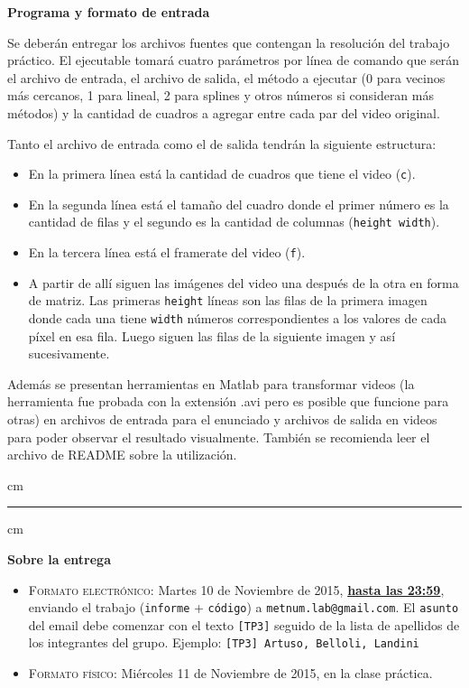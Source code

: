 {\bf\noindent Programa y formato de entrada}

Se deberán entregar los archivos fuentes que contengan la resolución del trabajo práctico. El ejecutable tomará cuatro parámetros por línea de comando que serán el archivo de entrada, el archivo de salida, el método a ejecutar (0 para vecinos más cercanos, 1 para lineal, 2 para splines y otros números si consideran más métodos) y la cantidad de cuadros a agregar entre cada par del video original.

Tanto el archivo de entrada como el de salida tendrán la siguiente estructura:

\begin{itemize}
  \item En la primera línea está la cantidad de cuadros que tiene el video (\verb|c|).
  \item En la segunda línea está el tamaño del cuadro donde el primer número es la cantidad de filas y el segundo es la cantidad de columnas (\verb|height width|).
  \item En la tercera línea está el framerate del video (\verb|f|).
  \item A partir de allí siguen las imágenes del video una después de la otra en forma de matriz. Las primeras \verb|height| l\'ineas son las filas de la primera imagen donde cada una tiene \verb|width| n\'umeros correspondientes a los valores de cada píxel en esa fila. Luego siguen las filas de la siguiente imagen y as\'i sucesivamente.
\end{itemize}

Además se presentan herramientas en Matlab para transformar videos (la herramienta fue probada con la extensión .avi pero es posible que funcione para otras) en archivos de entrada para el enunciado y archivos de salida en videos para poder observar el resultado visualmente. También se recomienda leer el archivo de README sobre la utilización.


 cm
\hrule
{} cm

{\bf Sobre la entrega}
\begin{itemize}
\item \textsc{Formato electr\'onico:} Martes 10 de Noviembre de 2015, {\bf{\underline{hasta las 23:59}}}, enviando el trabajo
(\texttt{informe} + \texttt{c\'odigo}) a \texttt{metnum.lab@gmail.com}. El \texttt{asunto} del email debe comenzar con el texto \verb|[TP3]| seguido
de la lista de apellidos de los integrantes del grupo. Ejemplo: \texttt{[TP3] Artuso, Belloli, Landini}
\item \textsc{Formato f\'isico:} Mi\'ercoles 11 de Noviembre de 2015, en la clase pr\'actica.
\end{itemize}


%
